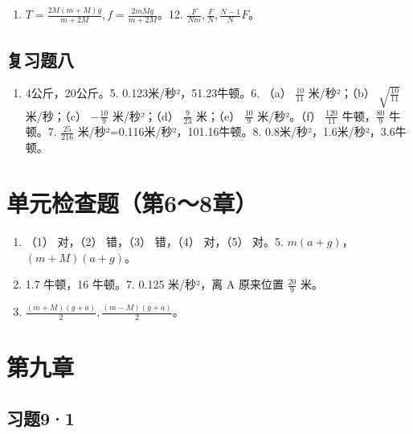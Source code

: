 \begin{enumerate}
\def\labelenumi{\arabic{enumi}.}
\setcounter{enumi}{10}
\tightlist
\item
  \(T = \frac{2M(m + M)g}{m + 2M}, f = \frac{2mMg}{m + 2M}\)。12.
  \(\frac{F}{Nm}, \frac{F}{N}, \frac{N - 1}{N} F\)。
\end{enumerate}

\subsection{复习题八}\label{ux590dux4e60ux9898ux516b-1}

\begin{enumerate}
\def\labelenumi{\arabic{enumi}.}
\setcounter{enumi}{3}
\tightlist
\item
  4公斤，20公斤。5. 0.123米/秒²，51.23牛顿。6. （a） \(\frac{10}{11}\)
  米/秒²；（b） \(\sqrt{\frac{10}{11}}\) 米/秒；（c） \(-\frac{10}{9}\)
  米/秒²；（d） \(\frac{9}{23}\) 米；（e） \(\frac{10}{9}\)
  米/秒²。（f） \(\frac{120}{11}\) 牛顿，\(\frac{80}{9}\) 牛顿。7.
  \(\frac{25}{216}\) 米/秒²=0.116米/秒²，101.16牛顿。8.
  0.8米/秒²，1.6米/秒²，3.6牛顿。
\end{enumerate}

\section{单元检查题（第6～8章）}\label{ux5355ux5143ux68c0ux67e5ux9898ux7b2c68ux7ae0-1}

\begin{enumerate}
\def\labelenumi{\arabic{enumi}.}
\setcounter{enumi}{3}
\item
  （1） 对，（2） 错，（3） 错，（4） 对，（5） 对。5.
  \(m(a + g)\)，\((m + M)(a + g)\)。
\item
  1.7 牛顿，16 牛顿。7. 0.125 米/秒²，离 A 原来位置 \(\frac{20}{9}\)
  米。
\item
  \(\frac{(m + M)(g + a)}{2}, \frac{(m - M)(g + a)}{2}\)。
\end{enumerate}

\section{第九章}\label{ux7b2cux4e5dux7ae0}

\subsection{习题9·1}\label{ux4e60ux989891-1}

